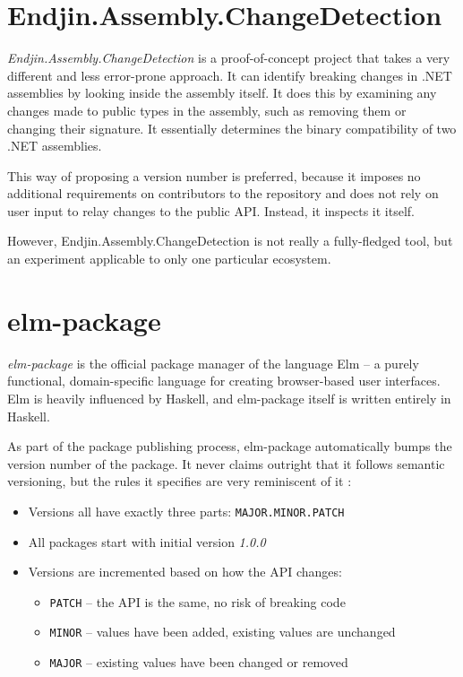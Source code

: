 \documentclass{l4proj}
\newcommand\genericstyle{\lstset{basicstyle=\ttm}}
\newcommand\codeinline[1]{{\genericstyle\lstinline!#1!}}
\begin{document}
\section{Endjin.Assembly.ChangeDetection}

\textit{Endjin.Assembly.ChangeDetection} \cite{Endjin} is a
proof-of-concept project that takes a very different and less
error-prone approach. It can identify breaking changes in .NET
assemblies by looking inside the assembly itself. It does this
by examining any changes made to public types in the assembly, such as
removing them or changing their signature. It essentially determines
the binary compatibility of two .NET assemblies.

This way of proposing a version number is preferred, because it
imposes no additional requirements on contributors to the repository
and does not rely on user input to relay changes to the public API.
Instead, it inspects it itself.

However, Endjin.Assembly.ChangeDetection is not really a fully-fledged
tool, but an experiment applicable to only one particular ecosystem.

\section{elm-package}

\textit{elm-package} \cite{ElmPackage} is the official package manager
of the language Elm -- a purely functional, domain-specific
language for creating browser-based user interfaces. Elm is heavily
influenced by Haskell, and elm-package itself is written entirely in
Haskell.

As part of the package publishing process, elm-package automatically
bumps the version number of the package. It never claims outright that
it follows semantic versioning, but the rules it specifies are very
reminiscent of it \cite{ElmPackageVR}:

\begin{itemize}
\item Versions all have exactly three parts: \codeinline{MAJOR.MINOR.PATCH}
\item All packages start with initial version \textit{1.0.0}
\item Versions are incremented based on how the API changes:
\begin{itemize}
\item \codeinline{PATCH} -- the API is the same, no risk of breaking code
\item \codeinline{MINOR} -- values have been added, existing values are unchanged
\item \codeinline{MAJOR} -- existing values have been changed or removed
\end{itemize}
\end{itemize}
\end{document}
